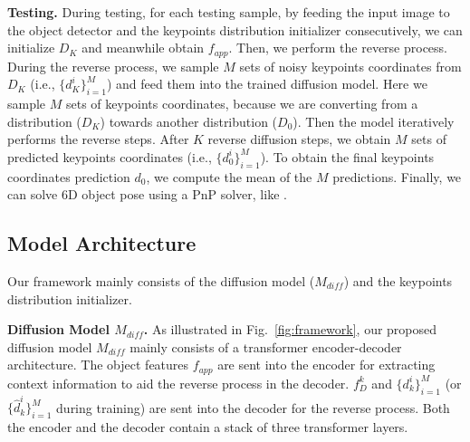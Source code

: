 \documentclass[10pt,twocolumn,letterpaper]{article}
\begin{document}
\noindent\textbf{Testing.} 
During testing, for each testing sample, by feeding the input image to the object detector and the keypoints distribution initializer consecutively, we can initialize $D_K$ and meanwhile obtain $f_{app}$. 
Then, we perform the reverse process.
During the reverse process, we sample $M$ sets of noisy keypoints coordinates from $D_K$ (i.e., $\{d^i_K\}^{M}_{i=1}$) and feed them into the trained diffusion model.
Here we sample $M$ sets of keypoints coordinates, because we are converting from a distribution ($D_K$) towards another distribution ($D_0$).
Then the model iteratively performs the reverse steps.
After $K$ reverse diffusion steps, we obtain $M$ sets of predicted keypoints coordinates (i.e., $\{d^i_0\}^{M}_{i=1}$).
To obtain the final keypoints coordinates prediction $d_0$, we compute the mean of the $M$ predictions. 
Finally, we can solve 6D object pose using a PnP solver, like \cite{peng2019pvnet,su2022zebrapose}.

\subsection{Model Architecture}
\label{Sec:architecture}
Our framework mainly consists of the diffusion model ($M_{diff}$) and the keypoints distribution initializer.

\noindent\textbf{Diffusion Model $M_{diff}$.}
As illustrated in Fig.~\ref{fig:framework}, our proposed diffusion model $M_{diff}$ mainly consists of a transformer encoder-decoder architecture.
The object features $f_{app}$ 
are sent into the encoder for extracting context information to aid the reverse process in the decoder. 
$f^k_D$ and $\{d^i_k\}^{M}_{i=1}$ (or $\{\hat{d}^i_k\}^{M}_{i=1}$ during training) are sent into the decoder for the reverse process.
Both the encoder and the decoder contain a stack of three transformer layers.
\end{document}
